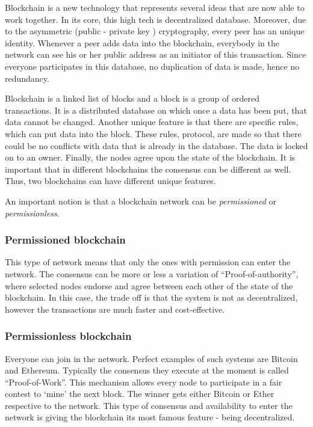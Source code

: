 \documentclass[a4paper,11pt]{report}
\begin{document}
Blockchain is a new technology that represents several ideas that are now able to work together. In its core, this high tech is decentralized database. Moreover, due to the asymmetric (public - private key ) cryptography, every peer has an unique identity. Whenever a peer adds data into the blockchain, everybody in the network can see his or her public address as an initiator of this transaction. Since everyone participates in this database, no duplication of data is made, hence no redundancy. 
 
	Blockchain is a linked list of blocks and a block is a group of ordered transactions. It is a distributed database on which once a data has been put, that data cannot be changed. Another unique feature is that there are specific rules, which can put data into the block. These rules, protocol, are made so that there could be no conflicts with data that is already in the database. The data is locked on to an owner. Finally, the nodes agree upon the state of the blockchain.\cite{whatIsBlockchain} It is important that in different blockchains the consensus can be different as well. Thus, two blockchains can have different unique features.
	
	An important notion is that a blockchain network can be \textit{permissioned} or \textit{permissionless}.

\subsubsection{Permissioned blockchain}
This type of network means that only the ones with permission can enter the network. The consensus can be more or less a variation of “Proof-of-authority”, where selected nodes endorse and agree between each other of the state of the blockchain. In this case, the trade off is that the system is not as decentralized, however the transactions are much faster and cost-effective.

\subsubsection{Permissionless blockchain}
Everyone can join in the network. Perfect examples of such systems are Bitcoin and Ethereum. Typically the consensus they execute at the moment is called “Proof-of-Work”. This mechanism allows every node to participate in a fair contest to ‘mine’ the next block. The winner gets either Bitcoin or Ether respective to the network. This type of consensus and availability to enter the network is giving the blockchain its most famous feature - being decentralized.
\end{document}
